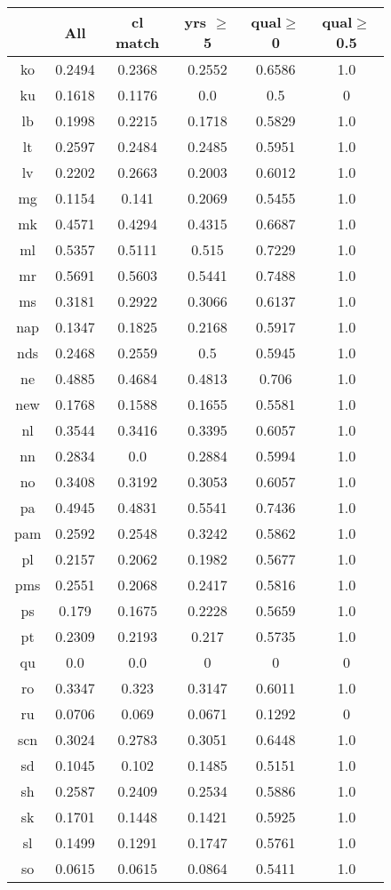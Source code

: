 \begin{figure}[h]
\centering
\begin{tabular}{cccccc}
&All&cl match&yrs $\geq$ 5&qual$\geq$0&qual$\geq$0.5\\
\hline\hline
ko&0.2494&0.2368&0.2552&0.6586&1.0\\
ku&0.1618&0.1176&0.0&0.5&0\\
lb&0.1998&0.2215&0.1718&0.5829&1.0\\
lt&0.2597&0.2484&0.2485&0.5951&1.0\\
lv&0.2202&0.2663&0.2003&0.6012&1.0\\
mg&0.1154&0.141&0.2069&0.5455&1.0\\
mk&0.4571&0.4294&0.4315&0.6687&1.0\\
ml&0.5357&0.5111&0.515&0.7229&1.0\\
mr&0.5691&0.5603&0.5441&0.7488&1.0\\
ms&0.3181&0.2922&0.3066&0.6137&1.0\\
nap&0.1347&0.1825&0.2168&0.5917&1.0\\
nds&0.2468&0.2559&0.5&0.5945&1.0\\
ne&0.4885&0.4684&0.4813&0.706&1.0\\
new&0.1768&0.1588&0.1655&0.5581&1.0\\
nl&0.3544&0.3416&0.3395&0.6057&1.0\\
nn&0.2834&0.0&0.2884&0.5994&1.0\\
no&0.3408&0.3192&0.3053&0.6057&1.0\\
pa&0.4945&0.4831&0.5541&0.7436&1.0\\
pam&0.2592&0.2548&0.3242&0.5862&1.0\\
pl&0.2157&0.2062&0.1982&0.5677&1.0\\
pms&0.2551&0.2068&0.2417&0.5816&1.0\\
ps&0.179&0.1675&0.2228&0.5659&1.0\\
pt&0.2309&0.2193&0.217&0.5735&1.0\\
qu&0.0&0.0&0&0&0\\
ro&0.3347&0.323&0.3147&0.6011&1.0\\
ru&0.0706&0.069&0.0671&0.1292&0\\
scn&0.3024&0.2783&0.3051&0.6448&1.0\\
sd&0.1045&0.102&0.1485&0.5151&1.0\\
sh&0.2587&0.2409&0.2534&0.5886&1.0\\
sk&0.1701&0.1448&0.1421&0.5925&1.0\\
sl&0.1499&0.1291&0.1747&0.5761&1.0\\
so&0.0615&0.0615&0.0864&0.5411&1.0\\

\end{tabular}
\end{figure}
